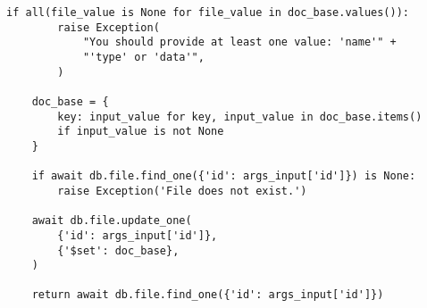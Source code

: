 \begin{Verbatim}[fontsize=\footnotesize]
    if all(file_value is None for file_value in doc_base.values()):
        raise Exception(
            "You should provide at least one value: 'name'" +
            "'type' or 'data'",
        )

    doc_base = {
        key: input_value for key, input_value in doc_base.items()
        if input_value is not None
    }

    if await db.file.find_one({'id': args_input['id']}) is None:
        raise Exception('File does not exist.')

    await db.file.update_one(
        {'id': args_input['id']},
        {'$set': doc_base},
    )

    return await db.file.find_one({'id': args_input['id']})
\end{Verbatim}
